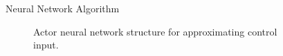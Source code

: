 \documentclass[final]{beamer}
\newlength{\sepwid}
\newlength{\onecolwid}
\begin{document}
\begin{frame}[t]
\begin{columns}[t]
\begin{column}{\onecolwid}
\begin{block}{Neural Network Algorithm}
\begin{figure}
\begin{tikzpicture}[x=1.5cm, y=1.5cm]
      \end{tikzpicture}
  \caption{Actor neural network structure for approximating control input.}
  \label{fig:nnActor}
\end{figure}



\vskip 1.5cm


\vskip -2.5cm
\end{block}



\end{column} %

\begin{column}{\sepwid}\end{column}

\begin{column}{\onecolwid} %



\end{column}
\end{columns}
\end{frame}
\end{document}
